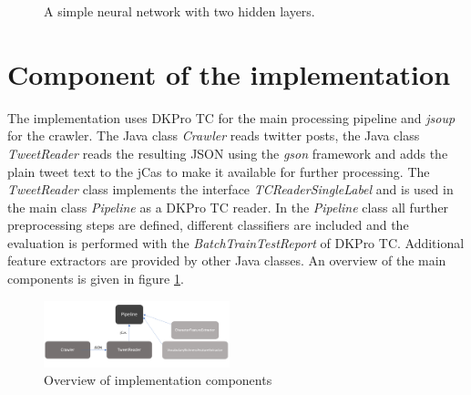 \documentclass[journal, a4paper, 12pt]{IEEEtran}
\begin{document}
\begin{figure}[h]
	\caption{A simple neural network with two hidden layers.}
	\centering
	\vspace{5mm}
\end{figure}

\section{Component of the implementation}
The implementation uses DKPro TC for the main processing pipeline and \textit{jsoup} for the crawler. The Java class \textit{Crawler} reads twitter posts, the Java class \textit{TweetReader} reads the resulting JSON using the \textit{gson} framework and adds the plain tweet text to the jCas to make it available for further processing. The \textit{TweetReader} class implements the interface \textit{TCReaderSingleLabel} and is used in the main class \textit{Pipeline} as a DKPro TC reader. In the \textit{Pipeline} class all further preprocessing steps are defined, different classifiers are included and the evaluation is performed with the \textit{BatchTrainTestReport} of DKPro TC. Additional feature extractors are provided by other Java classes. An overview of the main components is given in figure \ref{fig:components}.
\begin{figure}[h]
	\caption{Overview of implementation components}
	\label{fig:components}
	\centering
	\vspace{5mm}
	\includegraphics[width=0.48\textwidth]{components.PNG}
\end{figure}
\end{document}
